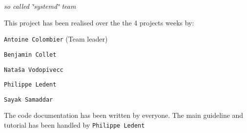 {\itshape so called \char`\"{}systemd\char`\"{} team}

This project has been realised over the the 4 project\textquotesingle{}s weeks by\+:


\begin{DoxyItemize}
\item {\tt Antoine Colombier} (Team leader)
\item {\tt Benjamin Collet}
\item {\tt Nataša Vodopivecc}
\item {\tt Philippe Ledent}
\item {\tt Sayak Samaddar}
\end{DoxyItemize}

The code documentation has been written by everyone. The main guideline and tutorial has been handled by {\tt Philippe Ledent} 
